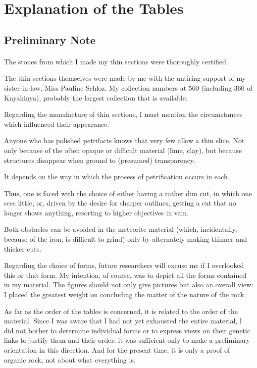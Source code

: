 \documentclass[a4paper, 12pt, oneside]{article}
\begin{document}
\section{Explanation of the Tables}
\subsection{Preliminary Note}
\paragraph{}
The stones from which I made my thin sections were thoroughly certified.

The thin sections themselves were made by me with the untiring support of my sister-in-law, Miss Pauline Schloz. My collection numbers at 560 (including 360 of Knyahinya), probably the largest collection that is available.

Regarding the manufacture of thin sections, I must mention the circumstances which influenced their appearance.

Anyone who has polished petrifacts knows that very few allow a thin slice. Not only because of the often opaque or difficult material (lime, clay), but because structures disappear when ground to (presumed) transparency.

It depends on the way in which the process of petrification occurs in each.

Thus, one is faced with the choice of either having a rather dim cut, in which one sees little, or, driven by the desire for sharper outlines, getting a cut that no longer shows anything, resorting to higher objectives in vain.

Both obstacles can be avoided in the meteorite material (which, incidentally, because of the iron, is difficult to grind) only by alternately making thinner and thicker cuts.

Regarding the choice of forms, future researchers will excuse me if I overlooked this or that form. My intention, of course, was to depict all the forms contained in my material. The figures should not only give pictures but also an overall view: I placed the greatest weight on concluding the matter of the nature of the rock.

As far as the order of the tables is concerned, it is related to the order of the material. Since I was aware that I had not yet exhausted the entire material, I did not bother to determine individual forms or to express views on their genetic links to justify them and their order: it was sufficient only to make a preliminary orientation in this direction. And for the present time, it is only a proof of organic rock, not about what everything is.
\end{document}

